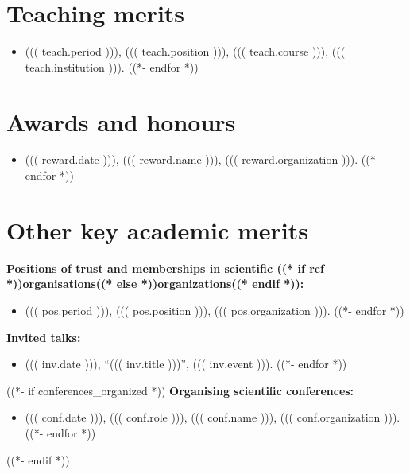 \documentclass[a4paper,12pt]{article}
\begin{document}
\section*{Teaching merits}

\begin{itemize}
((*- for teach in teachings *))
\item ((( teach.period ))), ((( teach.position ))), ((( teach.course ))), ((( teach.institution ))).
((*- endfor *))
\end{itemize}

\section*{Awards and honours}

\begin{itemize}
((*- for reward in rewards *))
\item ((( reward.date ))), ((( reward.name ))), ((( reward.organization ))).
((*- endfor *))
\end{itemize}

\section*{Other key academic merits}

\textbf{Positions of trust and memberships in scientific ((* if rcf *))organisations((* else *))organizations((* endif *)):}
\begin{itemize}
((*- for pos in activity_positions *))
\item ((( pos.period ))), ((( pos.position ))), ((( pos.organization ))).
((*- endfor *))
\end{itemize}

\medskip
\textbf{Invited talks:}
\begin{itemize}
((*- for inv in invitations *))
\item ((( inv.date ))), ``((( inv.title )))'', ((( inv.event ))).
((*- endfor *))
\end{itemize}

((*- if conferences_organized *))
\medskip
\textbf{Organising scientific conferences:}
\begin{itemize}
((*- for conf in conferences_organized *))
\item ((( conf.date ))), ((( conf.role ))), ((( conf.name ))), ((( conf.organization ))).
((*- endfor *))
\end{itemize}
((*- endif *))
\end{document}
